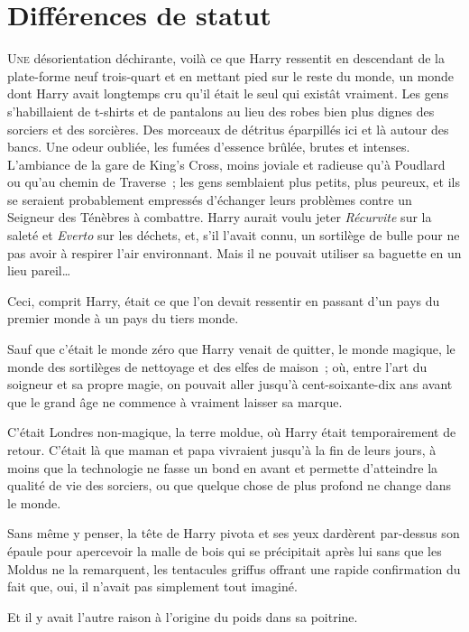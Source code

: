 \chapter{Différences de statut}

\lettrine{U}{ne} désorientation déchirante, voilà ce que Harry ressentit en descendant de la plate-forme neuf trois-quart et en mettant pied sur le reste du monde, un monde dont Harry avait longtemps cru qu'il était le seul qui existât vraiment.
Les gens s'habillaient de t-shirts et de pantalons au lieu des robes bien plus dignes des sorciers et des sorcières.
Des morceaux de détritus éparpillés ici et là autour des bancs.
Une odeur oubliée, les fumées d'essence brûlée, brutes et intenses.
L'ambiance de la gare de King's Cross, moins joviale et radieuse qu'à Poudlard ou qu'au chemin de Traverse~; les gens semblaient plus petits, plus peureux, et ils se seraient probablement empressés d'échanger leurs problèmes contre un Seigneur des Ténèbres à combattre.
Harry aurait voulu jeter \emph{Récurvite} sur la saleté et \emph{Everto} sur les déchets, et, s'il l'avait connu, un sortilège de bulle pour ne pas avoir à respirer l'air environnant.
Mais il ne pouvait utiliser sa baguette en un lieu pareil…

Ceci, comprit Harry, était ce que l'on devait ressentir en passant d'un pays du premier monde à un pays du tiers monde.

Sauf que c'était le monde zéro que Harry venait de quitter, le monde magique, le monde des sortilèges de nettoyage et des elfes de maison~; où, entre l'art du soigneur et sa propre magie, on pouvait aller jusqu'à cent-soixante-dix ans avant que le grand âge ne commence à vraiment laisser sa marque.

C'était Londres non-magique, la terre moldue, où Harry était temporairement de retour.
C'était là que maman et papa vivraient jusqu'à la fin de leurs jours, à moins que la technologie ne fasse un bond en avant et permette d'atteindre la qualité de vie des sorciers, ou que quelque chose de plus profond ne change dans le monde.

Sans même y penser, la tête de Harry pivota et ses yeux dardèrent par-dessus son épaule pour apercevoir la malle de bois qui se précipitait après lui sans que les Moldus ne la remarquent, les tentacules griffus offrant une rapide confirmation du fait que, oui, il n'avait pas simplement tout imaginé.

Et il y avait l'autre raison à l'origine du poids dans sa poitrine.

